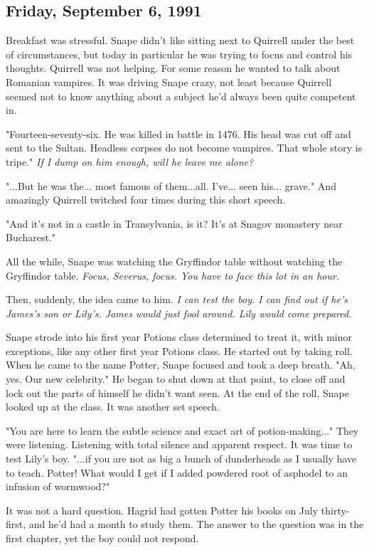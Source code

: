 \documentclass[a4paper,11pt]{article}
\begin{document}
\subsection{Friday, September 6, 1991}

Breakfast was stressful. Snape didn't like sitting next to Quirrell under the best of circumstances, but today in particular he was trying to focus and control his thoughts. Quirrell was not helping. For some reason he wanted to talk about Romanian vampires. It was driving Snape crazy, not least because Quirrell seemed not to know anything about a subject he'd always been quite competent in.

"Fourteen-seventy-six. He was killed in battle in 1476. His head was cut off and sent to the Sultan. Headless corpses do not become vampires. That whole story is tripe." \emph{If I dump on him enough, will he leave me alone?}

"...But he was the... most famous of them...all. I've... seen his... grave." And amazingly Quirrell twitched four times during this short speech.

"And it's not in a castle in Transylvania, is it? It's at Snagov monastery near Bucharest."

All the while, Snape was watching the Gryffindor table without watching the Gryffindor table. \emph{Focus, Severus, focus. You have to face this lot in an hour.}

Then, suddenly, the idea came to him. \emph{I can test the boy. I can find out if he's James's son or Lily's. James would just fool around. Lily would come prepared.}

Snape strode into his first year Potions class determined to treat it, with minor exceptions, like any other first year Potions class. He started out by taking roll. When he came to the name Potter, Snape focused and took a deep breath. "Ah, yes. Our new celebrity." He began to shut down at that point, to close off and lock out the parts of himself he didn't want seen. At the end of the roll, Snape looked up at the class. It was another set speech.

"You are here to learn the subtle science and exact art of potion-making..." They were listening. Listening with total silence and apparent respect. It was time to test Lily's boy. "...if you are not as big a bunch of dunderheads as I usually have to teach. Potter! What would I get if I added powdered root of asphodel to an infusion of wormwood?"

It was not a hard question. Hagrid had gotten Potter his books on July thirty-first, and he'd had a month to study them. The answer to the question was in the first chapter, yet the boy could not respond.
\end{document}
